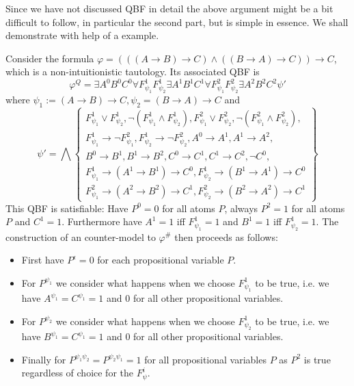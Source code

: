 \documentclass[a4paper,UKenglish,cleveref, autoref, thm-restate]{lipics-v2021}
\begin{document}
Since we have not discussed QBF in detail the above argument might be a bit difficult to follow, in particular the second part, but is simple in essence. We shall demonstrate with help of a example.

\begin{example}
	Consider the formula $\varphi = (((A\to B)\to C)\wedge((B\to A)\to C))\to C$, which is a non-intuitionistic tautology. Its associated QBF is $$\varphi^Q = \exists A^0B^0C^0\forall F_{\psi_1}^1F_{\psi_2}^1 \exists A^1B^1C^1\forall F_{\psi_1}^2F_{\psi_2}^2 \exists A^2B^2C^2\psi'$$where $\psi_1 := (A\to B)\to C, \psi_2 = (B\to A)\to C$ and $$\psi' = \bigwedge\left\{\begin{matrix}
		F^1_{\psi_1}\vee F^1_{\psi_2}, \neg(F^1_{\psi_1}\wedge F^1_{\psi_2}), F^2_{\psi_1}\vee F^2_{\psi_2},\neg(F^2_{\psi_1}\wedge F^2_{\psi_2}),\\F^1_{\psi_1}\to\neg F^2_{\psi_1},F^1_{\psi_2}\to\neg F^2_{\psi_2}, A^0\to A^1,A^1\to A^2, 
		\\B^0\to B^1, B^1\to B^2, C^0\to C^1, C^1\to C^2,\neg C^0, \\
		F^1_{\psi_1}\to (A^1\to B^1)\to C^0, F^1_{\psi_2}\to(B^1\to A^1)\to C^0\\
		F^2_{\psi_1}\to (A^2\to B^2)\to C^1, F^2_{\psi_2}\to(B^2\to A^2)\to C^1
	\end{matrix}\right\}$$
	This QBF is satisfiable: Have $P^0 = 0$ for all atoms $P$, always $P^2 = 1$ for all atoms $P$ and $C^1 = 1$. Furthermore have $A^1 = 1$ iff $F^1_{\psi_1} = 1$ and $B^1 = 1$ iff $F^1_{\psi_2} = 1$. The construction of an counter-model to $\varphi^\#$ then proceeds as follows:
	\begin{itemize}
		\item First have $P^\epsilon = 0$ for each propositional variable $P$.
		\item For $P^{\psi_1}$ we consider what happens when we choose $F^1_{\psi_1}$ to be true, i.e. we have $A^{\psi_1} = C^{\psi_1} = 1$ and $0$ for all other propositional variables.
		\item For $P^{\psi_2}$ we consider what happens when we choose $F^1_{\psi_2}$ to be true, i.e. we have $B^{\psi_1} = C^{\psi_1} = 1$ and $0$ for all other propositional variables.
		\item Finally for $P^{\psi_1\psi_2} = P^{\psi_2\psi_1} = 1$ for all propositional variables $P$ as $P^2$ is true regardless of choice for the $F^i_\psi$. 
	\end{itemize}
\end{example}	
\end{document}
